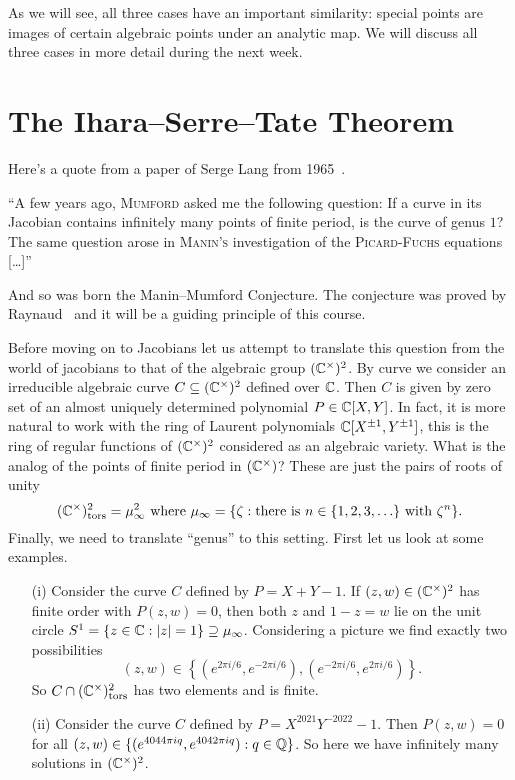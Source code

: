 As we will see, all three cases have an important similarity: special
points are images of certain algebraic points under an analytic map.
We will discuss all three cases in more detail during the next week. 

\section{The Ihara--Serre--Tate Theorem}
\label{sec:ist}

Here's a quote from a paper of Serge Lang from
1965~\cite{Lang:Division}.

\begin{displayquote}
  ``A few years ago, \textsc{Mumford} asked me the following question:
  If a curve in its Jacobian contains infinitely many points of finite
  period, is the curve of genus $1$? The same question arose in
  \textsc{Manin's} investigation of the \textsc{Picard-Fuchs}
  equations [\ldots]''
\end{displayquote}
And so was born the Manin--Mumford Conjecture. The conjecture was
proved by Raynaud~\cite{Raynaud:MM} and it will be a guiding principle of this
course. 

Before moving on to Jacobians let us attempt to translate this question
from the world of jacobians to that  of the algebraic group $({\mathbb{C}}^\times)^2$. By
curve we consider an irreducible algebraic curve $C\subseteq
({\mathbb{C}}^\times)^2$ defined over ${\mathbb{C}}$. Then $C$ is given by zero set of
an almost uniquely determined polynomial $P\in {\mathbb{C}}[X,Y]$.
In fact, it is more natural to work with the ring of
Laurent polynomials ${\mathbb{C}}[X^{\pm 1},Y^{\pm 1}]$, this is the ring of
regular functions of $({\mathbb{C}}^\times)^2$ considered as an algebraic
variety.
What is the analog of the points of finite period in $({\mathbb{C}}^\times)$?
These are just the pairs of roots of unity
$$ ({\mathbb{C}}^\times)^2_{\mathrm{tors}}= \mu_\infty^2  \text{ where
}\mu_\infty = \{\zeta : \text{there is $n\in\{1,2,3,\ldots\}$
  with }\zeta^n \}.$$
Finally, we need to translate ``genus'' to this setting. First let us
look at some examples.

\begin{example}
  \begin{itemize}
  \item [(i)] Consider the curve $C$ defined by $P = X+Y-1$. If
    $(z,w)\in({\mathbb{C}}^\times)^2$ has finite order with $P(z,w)=0$, then
    both $z$ and $1-z=w$ lie on the unit circle $S^1= \{z\in{\mathbb{C}} :
    |z|=1\}\supseteq\mu_\infty$. 
    Considering a picture we find exactly two possibilities    
    $$
    (z,w) \in \left\{ (e^{2\pi i/6},e^{-2\pi i/6}),(e^{-2\pi
        i/6},e^{2\pi i/6})\right\}.
    $$
    So $C\cap ({\mathbb{C}}^\times)^2_{\mathrm{tors}}$ has two elements and is
    finite.

  \item[(ii)] Consider the curve $C$ defined by
    $P=X^{2021}Y^{-2022}-1$. Then
    $P(z,w)=0$ for all $(z,w)\in \{(e^{4044\pi iq},e^{4042\pi i
      q}) : q\in{\mathbb{Q}}\}$.
    So here we have infinitely many solutions in $({\mathbb{C}}^\times)^2$.
  \end{itemize}
\end{example}

